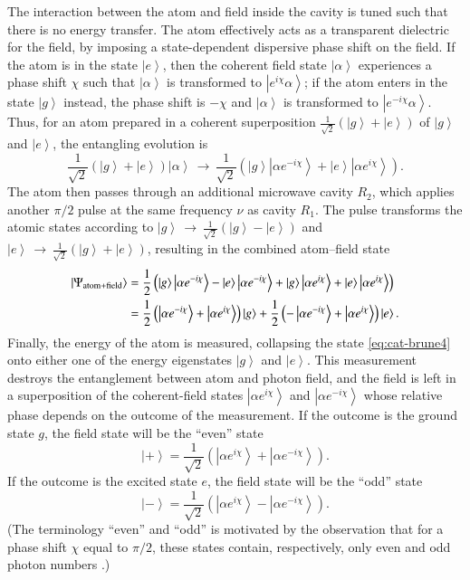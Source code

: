\documentclass[3p,sort&compress]{elsarticle}
\newcommand{\ket}[1]{\left\vert{#1}\right\rangle}
\newcommand{\E}{\ensuremath{e}}
\newcommand{\I}{\ensuremath{i}}
\begin{document}
The interaction between the atom and field inside the cavity is tuned such that there is no energy transfer. The atom effectively acts as a transparent dielectric for the field, by imposing a state-dependent dispersive phase shift on the field. If the atom is in the state $\ket{e}$, then the coherent field state $\ket{\alpha}$ experiences a phase shift $\chi$ such that $\ket{\alpha}$ is transformed to $\ket{\E^{i\chi} \alpha}$; if the atom enters in the state $\ket{g}$ instead, the phase shift is $-\chi$ and $\ket{\alpha}$ is transformed to $\ket{\E^{-i\chi} \alpha}$. Thus, for an atom prepared in a coherent superposition $\frac{1}{\sqrt{2}}\left( \ket{g} + \ket{e} \right)$ of $\ket{g}$ and $\ket{e}$, the entangling evolution is
%
\begin{equation}\label{eq:cat-brune}
  \frac{1}{\sqrt{2}}\left( \ket{g} + \ket{e} \right)  \ket{\alpha} \,\longrightarrow\,
  \frac{1}{\sqrt{2}} \left( \ket{g} \ket{\alpha \E^{-\I \chi}} + \ket{e} \ket{\alpha
      \E^{\I \chi}} \right).
\end{equation}
%
The atom then passes through an additional microwave cavity $R_2$, which applies another $\pi/2$ pulse at the same frequency $\nu$ as cavity $R_1$. The pulse transforms the atomic states according to $\ket{g} \,\longrightarrow\,\frac{1}{\sqrt{2}} \left( \ket{g} - \ket{e} \right)$ and $\ket{e} \,\longrightarrow\, \frac{1}{\sqrt{2}} \left( \ket{g} + \ket{e} \right)$, resulting in the combined atom--field state
%
\begin{align}\label{eq:cat-brune4}
\ket{\Psi_\text{atom+field}} &=
\frac{1}{2} \left( \ket{g} \ket{\alpha \E^{-\I \chi}} - \ket{e} \ket{\alpha \E^{-\I \chi}} +
  \ket{g} \ket{\alpha \E^{\I \chi}} + \ket{e} \ket{\alpha \E^{\I \chi}} \right) \notag \\
&= \frac{1}{2} \left( \ket{\alpha \E^{-\I \chi}} + \ket{\alpha \E^{\I \chi}} \right) \ket{g} +
\frac{1}{2} \left(- \ket{\alpha \E^{-\I \chi}} + \ket{\alpha \E^{\I \chi}} \right) \ket{e}.
\end{align}
%
Finally, the energy of the atom is measured, collapsing the state \eqref{eq:cat-brune4} onto either one of the energy eigenstates $\ket{g}$ and $\ket{e}$. This measurement destroys the entanglement between atom and photon field, and the field is left in a superposition of the coherent-field states $\ket{\alpha \E^{\I \chi}}$ and $\ket{\alpha \E^{-\I \chi}}$ whose relative phase depends on the outcome of the measurement. If the outcome is the ground state $g$, the field state will be the ``even'' state
%
\begin{equation}\label{eq:cat-bhvlhvlrune}
\ket{+} = \frac{1}{\sqrt{2}} \left( \ket{\alpha \E^{\I \chi}} + \ket{\alpha \E^{-\I \chi}} \right).
\end{equation}
%
If the outcome is the excited state $e$, the field state will be the ``odd'' state
%
\begin{equation}\label{eq:cat-baahvlhvlrune}
\ket{-} = \frac{1}{\sqrt{2}} \left( \ket{\alpha \E^{\I \chi}} - \ket{\alpha \E^{-\I \chi}} \right).
\end{equation}
%
(The terminology ``even'' and ``odd'' is motivated by the observation that for a phase shift $\chi$ equal to $\pi/2$, these states contain, respectively, only even and odd photon numbers \cite{Deleglise:2008:oo}.) 
\end{document}
